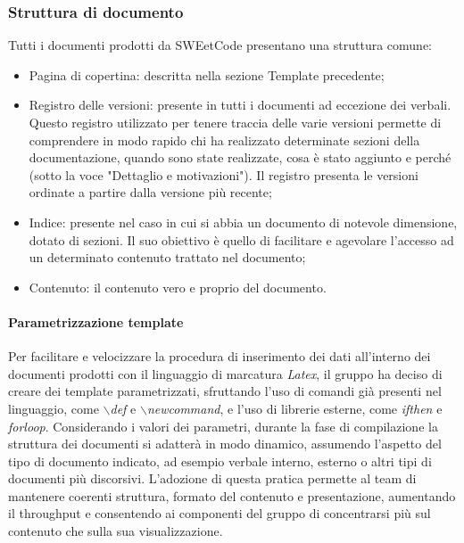\documentclass[10pt, a4paper]{article}
\begin{document}
    \subsubsection{Struttura di documento}
    Tutti i documenti prodotti da SWEetCode presentano una struttura comune:
    \begin{itemize}
        \item Pagina di copertina: descritta nella sezione Template precedente;
        \item Registro delle versioni: presente in tutti i documenti ad eccezione dei verbali. Questo registro utilizzato per tenere traccia delle varie versioni permette di comprendere in modo rapido chi ha realizzato determinate sezioni della documentazione, quando sono state realizzate, cosa è stato aggiunto e perché (sotto la voce "Dettaglio e motivazioni"). Il registro presenta le versioni ordinate a partire dalla versione più recente; 
        \item Indice: presente nel caso in cui si abbia un documento di notevole dimensione, dotato di sezioni. Il suo obiettivo è quello di facilitare e agevolare l'accesso ad un determinato contenuto trattato nel documento;
        \item Contenuto: il contenuto vero e proprio del documento.
    \end{itemize}

    \paragraph{Parametrizzazione template} Per facilitare e velocizzare la procedura di inserimento dei dati all'interno dei documenti prodotti con il linguaggio di marcatura \textit{Latex}, il gruppo ha deciso di creare dei template parametrizzati, sfruttando l'uso di comandi già presenti nel linguaggio, come \textit{$\backslash$def} e \textit{$\backslash$newcommand}, e l'uso di librerie esterne, come \textit{ifthen} e \textit{forloop}.
    Considerando i valori dei parametri, durante la fase di compilazione la struttura dei documenti si adatterà in modo dinamico, assumendo l'aspetto del tipo di documento indicato, ad esempio verbale interno, esterno o altri tipi di documenti più discorsivi. L'adozione di questa pratica permette al team di mantenere coerenti struttura, formato del contenuto e presentazione, aumentando il throughput e consentendo ai componenti del gruppo di concentrarsi più sul contenuto che sulla sua visualizzazione.
    
\end{document}
